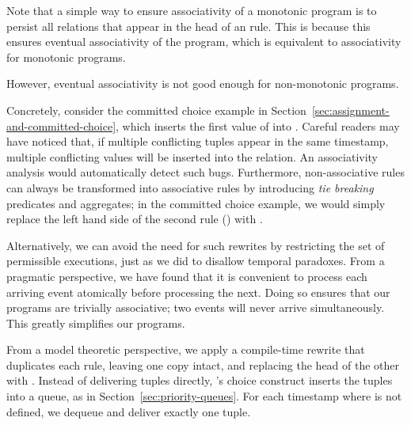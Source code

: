 Note that a simple way to ensure associativity of a monotonic program is to
persist all relations that appear in the head of an  rule.
This is because this ensures eventual associativity of the program, which is
equivalent to associativity for monotonic programs.

However, eventual associativity is not good enough for non-monotonic programs.


  Concretely, consider the committed choice
example in Section~\ref{sec:assignment-and-committed-choice}, which
inserts the first value of  into .
Careful readers may have noticed that, if multiple conflicting
 tuples appear in the same timestamp, multiple
conflicting values will be inserted into the  relation.
An associativity analysis would automatically detect such bugs.
Furthermore, non-associative rules can always be transformed 
into associative rules by introducing {\em tie breaking} predicates
and aggregates; in the committed choice example, we would simply
replace the left hand side of the second rule
() with .

Alternatively, we can avoid the need for such rewrites by restricting
the set of permissible executions, just as we did to disallow temporal
paradoxes.  From a pragmatic perspective, we have found that it is
convenient to process each arriving event atomically before processing
the next.  Doing so ensures that our programs are trivially
associative; two events will never arrive simultaneously.  This
greatly simplifies our programs.

From a model theoretic perspective, we apply a compile-time rewrite
that duplicates each  rule, leaving one copy intact,
and replacing the head of the other with .
Instead of delivering tuples directly, 's choice
construct inserts the tuples into a queue, as in
Section~\ref{sec:priority-queues}.  For each timestamp 
where  is not defined, we dequeue and deliver
exactly one tuple.

